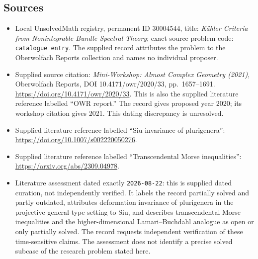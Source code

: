 \documentclass[11pt]{article}
\begin{document}
\subsection{Sources}
\begin{itemize}
\item Local UnsolvedMath registry, permanent ID \(30004544\), title: \emph{K\"ahler Criteria from Nonintegrable Bundle Spectral Theory}; exact source problem code: \texttt{catalogue entry}. The supplied record attributes the problem to the Oberwolfach Reports collection and names no individual proposer.
\item Supplied source citation: \emph{Mini-Workshop: Almost Complex Geometry (2021)}, Oberwolfach Reports, DOI 10.4171/owr/2020/33, pp.\ 1657--1691. \url{https://doi.org/10.4171/owr/2020/33}. This is also the supplied literature reference labelled ``OWR report.'' The record gives proposed year 2020; its workshop citation gives 2021. This dating discrepancy is unresolved.
\item Supplied literature reference labelled ``Siu invariance of plurigenera'': \url{https://doi.org/10.1007/s002220050276}.
\item Supplied literature reference labelled ``Transcendental Morse inequalities'': \url{https://arxiv.org/abs/2309.04978}.
\item Literature assessment dated exactly \texttt{2026-08-22}: this is supplied dated curation, not independently verified. It labels the record partially solved and partly outdated, attributes deformation invariance of plurigenera in the projective general-type setting to Siu, and describes transcendental Morse inequalities and the higher-dimensional Lamari--Buchdahl analogue as open or only partially solved. The record requests independent verification of these time-sensitive claims. The assessment does not identify a precise solved subcase of the research problem stated here.
\end{itemize}
\end{document}
